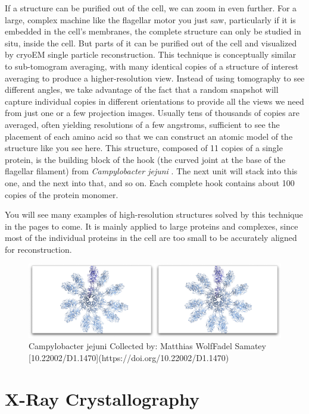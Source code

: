 \documentclass[]{tufte-book}
\begin{document}
If a structure can be purified out of the cell, we can zoom in even
further. For a large, complex machine like the flagellar motor you just
saw, particularly if it is embedded in the cell's membranes, the
complete structure can only be studied in situ, inside the cell. But
parts of it can be purified out of the cell and visualized by cryoEM
single particle reconstruction. This technique is conceptually similar
to sub-tomogram averaging, with many identical copies of a structure of
interest averaging to produce a higher-resolution view. Instead of using
tomography to see different angles, we take advantage of the fact that a
random snapshot will capture individual copies in different orientations
to provide all the views we need from just one or a few projection
images. Usually tens of thousands of copies are averaged, often yielding
resolutions of a few angstroms, sufficient to see the placement of each
amino acid so that we can construct an atomic model of the structure
like you see here. This structure, composed of 11 copies of a single
protein, is the building block of the hook (the curved joint at the base
of the flagellar filament) from \emph{Campylobacter jejuni}
\citet{matsunami2016}. The next unit will stack into this one, and the
next into that, and so on. Each complete hook contains about 100 copies
of the protein monomer.

You will see many examples of high-resolution structures solved by this
technique in the pages to come. It is mainly applied to large proteins
and complexes, since most of the individual proteins in the cell are too
small to be accurately aligned for reconstruction.

\begin{figure}
\includegraphics{movie_stills/1_8} \caption[Campylobacter jejuni Collected by]{Campylobacter jejuni Collected by: Matthias WolfFadel Samatey [10.22002/D1.1470](https://doi.org/10.22002/D1.1470)}\label{fig:unnamed-chunk-12}
\end{figure}

\section{X-Ray Crystallography}\label{x-ray-crystallography}
\end{document}
